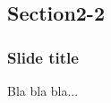 \documentclass[t,compress,aspectratio=169]{beamer}
\begin{document}
\subsection{Section2-2}
\begin{frame}
\frametitle{Slide title}
Bla bla bla...
\end{frame}


\begin{frame}
\begin{center}
\end{center}
\end{frame}





\end{document}
